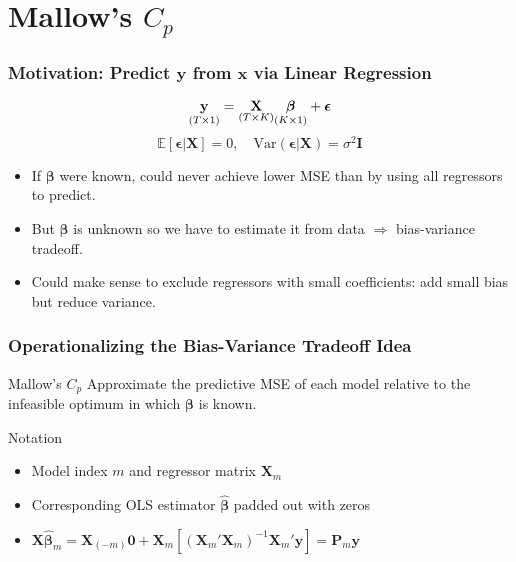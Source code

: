 \section{Mallow's $C_p$}
\begin{frame}
  \frametitle{Motivation: Predict $\mathbf{y}$ from $\mathbf{x}$ via Linear Regression}

  \[\underset{\small(T\times1)}{\textbf{y}} = \underset{(T\times K)}{\mathbf{X} }\underset{(K\times 1)}{\boldsymbol{\beta}} + \boldsymbol{\epsilon}\]
\small
\[\mathbb{E}[\boldsymbol{\epsilon}|\mathbf{X}] = 0 ,\quad
\text{Var}(\boldsymbol{\epsilon}|\mathbf{X}) = \sigma^2 \mathbf{I}\]
\normalsize

\pause

\begin{itemize}
  \item If $\boldsymbol{\beta}$ were known, could never achieve lower MSE than by using all regressors to predict.\pause
  \item But $\boldsymbol{\beta}$ is unknown so we have to estimate it from data $\Rightarrow$ bias-variance tradeoff.\pause
  \item Could make sense to exclude regressors with small coefficients: add small bias but reduce variance.
\end{itemize}
\end{frame}
\begin{frame}
  \frametitle{Operationalizing the Bias-Variance Tradeoff Idea}

  \begin{alertblock}{Mallow's $C_p$}
    Approximate the predictive MSE of each model relative to the infeasible optimum in which $\boldsymbol{\beta}$ is known. 
  \end{alertblock}

  \pause

  \begin{block}{Notation}
    \begin{itemize}
      \item Model index $m$ and regressor matrix $\mathbf{X}_m$
      \item Corresponding OLS estimator $\boldsymbol{\widehat{\beta}}$ padded out with zeros
      \item $\mathbf{X} \widehat{\boldsymbol{\beta}}_m = \mathbf{X}_{(-m)}\mathbf{0} + \mathbf{X}_m\left[ (\mathbf{X}_m'\mathbf{X}_m)^{-1}\mathbf{X}_m' \mathbf{y} \right] = \mathbf{P}_m \mathbf{y}$
    \end{itemize}
  \end{block}

\end{frame}
